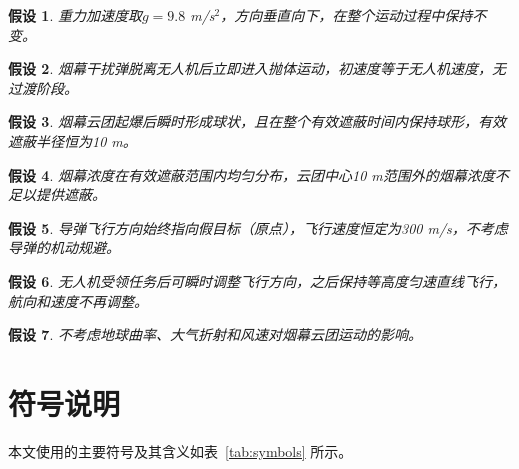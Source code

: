 \documentclass[12pt,a4paper]{article}
\newtheorem{assumption}{假设}
\begin{document}
\begin{assumption}
重力加速度取$g = 9.8$ m/s$^2$，方向垂直向下，在整个运动过程中保持不变。
\end{assumption}

\begin{assumption}
烟幕干扰弹脱离无人机后立即进入抛体运动，初速度等于无人机速度，无过渡阶段。
\end{assumption}

\begin{assumption}
烟幕云团起爆后瞬时形成球状，且在整个有效遮蔽时间内保持球形，有效遮蔽半径恒为10 m。
\end{assumption}

\begin{assumption}
烟幕浓度在有效遮蔽范围内均匀分布，云团中心10 m范围外的烟幕浓度不足以提供遮蔽。
\end{assumption}

\begin{assumption}
导弹飞行方向始终指向假目标（原点），飞行速度恒定为300 m/s，不考虑导弹的机动规避。
\end{assumption}

\begin{assumption}
无人机受领任务后可瞬时调整飞行方向，之后保持等高度匀速直线飞行，航向和速度不再调整。
\end{assumption}

\begin{assumption}
不考虑地球曲率、大气折射和风速对烟幕云团运动的影响。
\end{assumption}


\section{符号说明}

本文使用的主要符号及其含义如表~\ref{tab:symbols} 所示。
\end{document}
